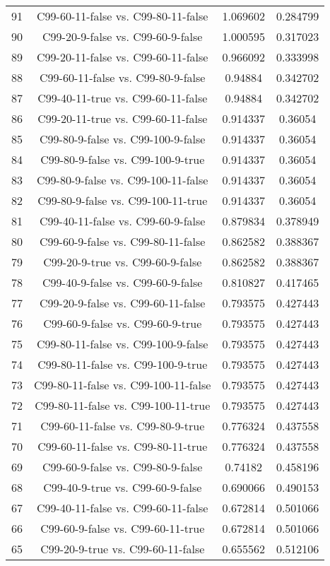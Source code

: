 \documentclass[a4paper,10pt]{article}
\begin{document}
\begin{landscape}
\begin{table}[!htp]
\begin{tabular}{cccc}
91&C99-60-11-false vs. C99-80-11-false&1.069602&0.284799\\
90&C99-20-9-false vs. C99-60-9-false&1.000595&0.317023\\
89&C99-20-11-false vs. C99-60-11-false&0.966092&0.333998\\
88&C99-60-11-false vs. C99-80-9-false&0.94884&0.342702\\
87&C99-40-11-true vs. C99-60-11-false&0.94884&0.342702\\
86&C99-20-11-true vs. C99-60-11-false&0.914337&0.36054\\
85&C99-80-9-false vs. C99-100-9-false&0.914337&0.36054\\
84&C99-80-9-false vs. C99-100-9-true&0.914337&0.36054\\
83&C99-80-9-false vs. C99-100-11-false&0.914337&0.36054\\
82&C99-80-9-false vs. C99-100-11-true&0.914337&0.36054\\
81&C99-40-11-false vs. C99-60-9-false&0.879834&0.378949\\
80&C99-60-9-false vs. C99-80-11-false&0.862582&0.388367\\
79&C99-20-9-true vs. C99-60-9-false&0.862582&0.388367\\
78&C99-40-9-false vs. C99-60-9-false&0.810827&0.417465\\
77&C99-20-9-false vs. C99-60-11-false&0.793575&0.427443\\
76&C99-60-9-false vs. C99-60-9-true&0.793575&0.427443\\
75&C99-80-11-false vs. C99-100-9-false&0.793575&0.427443\\
74&C99-80-11-false vs. C99-100-9-true&0.793575&0.427443\\
73&C99-80-11-false vs. C99-100-11-false&0.793575&0.427443\\
72&C99-80-11-false vs. C99-100-11-true&0.793575&0.427443\\
71&C99-60-11-false vs. C99-80-9-true&0.776324&0.437558\\
70&C99-60-11-false vs. C99-80-11-true&0.776324&0.437558\\
69&C99-60-9-false vs. C99-80-9-false&0.74182&0.458196\\
68&C99-40-9-true vs. C99-60-9-false&0.690066&0.490153\\
67&C99-40-11-false vs. C99-60-11-false&0.672814&0.501066\\
66&C99-60-9-false vs. C99-60-11-true&0.672814&0.501066\\
65&C99-20-9-true vs. C99-60-11-false&0.655562&0.512106\\

\end{tabular}
\end{table}
\end{landscape}
\end{document}
